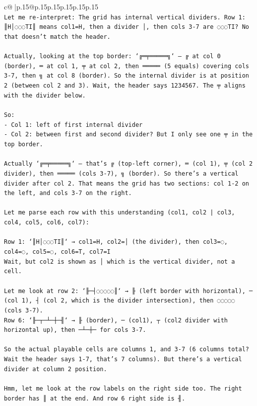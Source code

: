 \documentclass{article}
\begin{document}
{\begin{supertabular}{c@{$\;$}|p{.15\linewidth}@{}p{.15\linewidth}p{.15\linewidth}p{.15\linewidth}p{.15\linewidth}p{.15\linewidth}}
{{{\\ 
\texttt{Let me re{-}interpret: The grid has internal vertical dividers. Row 1: ║H│◌◌◌TI║ means col1=H, then a divider │, then cols 3{-}7 are ◌◌◌TI? No that doesn't match the header.} \\
\\ 
\texttt{Actually, looking at the top border: `╔═╤═════╗` — ╔ at col 0 (border), ═ at col 1, ╤ at col 2, then ═════ (5 equals) covering cols 3{-}7, then ╗ at col 8 (border). So the internal divider is at position 2 (between col 2 and 3). Wait, the header says 1234567. The ╤ aligns with the divider below.} \\
\\ 
\texttt{So:} \\
\texttt{{-} Col 1: left of first internal divider} \\
\texttt{{-} Col 2: between first and second divider? But I only see one ╤ in the top border.} \\
\\ 
\texttt{Actually `╔═╤═════╗` — that's ╔ (top{-}left corner), ═ (col 1), ╤ (col 2 divider), then ═════ (cols 3{-}7), ╗ (border). So there's a vertical divider after col 2. That means the grid has two sections: col 1{-}2 on the left, and cols 3{-}7 on the right.} \\
\\ 
\texttt{Let me parse each row with this understanding (col1, col2 | col3, col4, col5, col6, col7):} \\
\\ 
\texttt{Row 1: `║H│◌◌◌TI║` → col1=H, col2=│ (the divider), then col3=◌, col4=◌, col5=◌, col6=T, col7=I} \\
\texttt{Wait, but col2 is shown as │ which is the vertical divider, not a cell.} \\
\\ 
\texttt{Let me look at row 2: `╟─┤◌◌◌◌◌║` → ╟ (left border with horizontal), ─ (col 1), ┤ (col 2, which is the divider intersection), then ◌◌◌◌◌ (cols 3{-}7).} \\
\texttt{Row 6: `╟─┬─┴─┼─╢` → ╟ (border), ─ (col1), ┬ (col2 divider with horizontal up), then ─┴─┼─ for cols 3{-}7.} \\
\\ 
\texttt{So the actual playable cells are columns 1, and 3{-}7 (6 columns total? Wait the header says 1{-}7, that's 7 columns). But there's a vertical divider at column 2 position.} \\
\\ 
\texttt{Hmm, let me look at the row labels on the right side too. The right border has ║ at the end. And row 6 right side is ╢.} \\
}}}
\end{supertabular}}
\end{document}
